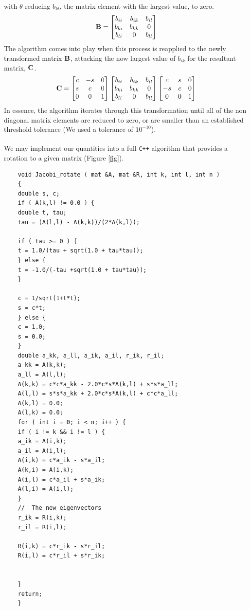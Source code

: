 \documentclass[%
reprint,
superscriptaddress,
showpacs,
nofootinbib,
bibnotes,amsmath,amssymb,aps,
prc, 
]{revtex4-1}
\begin{document}
	with $\theta$ reducing $b_{kl}$, the matrix element with the largest value, to zero.
	\begin{equation*}
		\bold{B} = \begin{bmatrix}
			b_{ii} & b_{ik} & b_{il} \\ b_{ki} & b_{kk} & 0  \\ b_{li} & 0 & b_{ll} \\ \end{bmatrix}
	\end{equation*}
	The algorithm comes into play when this process is reapplied to the newly transformed matrix $\bold{B}$, attacking the now largest value of $b_{ik}$ for the resultant matrix, $\bold{C}$.
	\begin{equation*}
		\bold{C} = 
		\begin{bmatrix} c & -s & 0\\ s & c & 0\\ 0 & 0 & 1 \end{bmatrix} 
		\begin{bmatrix}
			b_{ii} & b_{ik} & b_{il} \\ b_{ki} & b_{kk} & 0  \\ b_{li} & 0 & b_{ll} \\ \end{bmatrix}
		\begin{bmatrix} c & s & 0 \\-s & c & 0\\ 0 & 0 & 1 \end{bmatrix}
	\end{equation*}
	In essence, the algorithm iterates through this transformation until all of the non diagonal matrix elements are reduced to zero, or are smaller than an established threshold tolerance (We used a tolerance of $10^{-10}$).
	\\ \\
	We may implement our quantities into a full \verb|C++| algorithm that provides a rotation to a given matrix (Figure \ref{fig}).
	
	\begin{lstlisting}
	void Jacobi_rotate ( mat &A, mat &R, int k, int l, int n )
	{
	double s, c;
	if ( A(k,l) != 0.0 ) {
	double t, tau;
	tau = (A(l,l) - A(k,k))/(2*A(k,l));
	
	if ( tau >= 0 ) {
	t = 1.0/(tau + sqrt(1.0 + tau*tau));
	} else {
	t = -1.0/(-tau +sqrt(1.0 + tau*tau));
	}
	
	c = 1/sqrt(1+t*t);
	s = c*t;
	} else {
	c = 1.0;
	s = 0.0;
	}
	double a_kk, a_ll, a_ik, a_il, r_ik, r_il;
	a_kk = A(k,k);
	a_ll = A(l,l);
	A(k,k) = c*c*a_kk - 2.0*c*s*A(k,l) + s*s*a_ll;
	A(l,l) = s*s*a_kk + 2.0*c*s*A(k,l) + c*c*a_ll;
	A(k,l) = 0.0;
	A(l,k) = 0.0;
	for ( int i = 0; i < n; i++ ) {
	if ( i != k && i != l ) {
	a_ik = A(i,k);
	a_il = A(i,l);
	A(i,k) = c*a_ik - s*a_il;
	A(k,i) = A(i,k);
	A(i,l) = c*a_il + s*a_ik;
	A(l,i) = A(i,l);
	}
	//  The new eigenvectors
	r_ik = R(i,k);
	r_il = R(i,l);
	
	R(i,k) = c*r_ik - s*r_il;
	R(i,l) = c*r_il + s*r_ik;
	
	
	}
	return;
	}
	\end{lstlisting}
\end{document}
